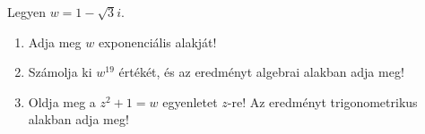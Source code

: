 \documentclass[11pt]{scrartcl}
\begin{document}
Legyen $w = 1 - \sqrt{3} i$.
\begin{enumerate}
	\item Adja meg $w$ exponenciális alakját!

	\item Számolja ki $w^{19}$ értékét, és az eredményt algebrai alakban adja
	      meg!

	\item Oldja meg a $z^2 + 1 = w$ egyenletet $z$-re! Az eredményt
	      trigonometrikus alakban adja meg!
\end{enumerate}
\end{document}
